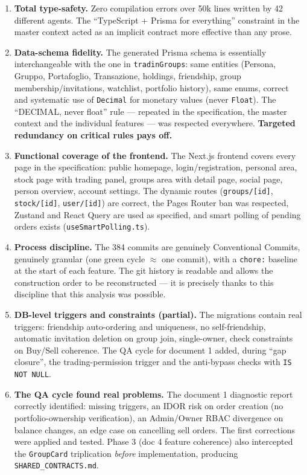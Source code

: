 \documentclass[11pt,a4paper]{article}
\newcommand{\file}[1]{\texttt{\small #1}}
\begin{document}
\begin{enumerate}[leftmargin=1.8em]
  \item \textbf{Total type-safety.} Zero compilation errors over 50k lines written by 42 different agents. The ``TypeScript + Prisma for everything'' constraint in the master context acted as an implicit contract more effective than any prose.

  \item \textbf{Data-schema fidelity.} The generated Prisma schema is essentially interchangeable with the one in \file{tradinGroups}: same entities (Persona, Gruppo, Portafoglio, Transazione, holdings, friendship, group membership/invitations, watchlist, portfolio history), same enums, correct and systematic use of \file{Decimal} for monetary values (never \file{Float}). The ``DECIMAL, never float'' rule --- repeated in the specification, the master context and the individual features --- was respected everywhere. \textbf{Targeted redundancy on critical rules pays off.}

  \item \textbf{Functional coverage of the frontend.} The Next.js frontend covers every page in the specification: public homepage, login/registration, personal area, stock page with trading panel, groups area with detail page, social page, person overview, account settings. The dynamic routes (\file{groups/[id]}, \file{stock/[id]}, \file{user/[id]}) are correct, the Pages Router ban was respected, Zustand and React Query are used as specified, and smart polling of pending orders exists (\file{useSmartPolling.ts}).

  \item \textbf{Process discipline.} The 384 commits are genuinely Conventional Commits, genuinely granular (one green cycle $\approx$ one commit), with a \file{chore:} baseline at the start of each feature. The git history is readable and allows the construction order to be reconstructed --- it is precisely thanks to this discipline that this analysis was possible.

  \item \textbf{DB-level triggers and constraints (partial).} The migrations contain real triggers: friendship auto-ordering and uniqueness, no self-friendship, automatic invitation deletion on group join, single-owner, check constraints on Buy/Sell coherence. The QA cycle for document 1 added, during ``gap closure'', the trading-permission trigger and the anti-bypass checks with \file{IS NOT NULL}.

  \item \textbf{The QA cycle found real problems.} The document 1 diagnostic report correctly identified: missing triggers, an IDOR risk on order creation (no portfolio-ownership verification), an Admin/Owner RBAC divergence on balance changes, an edge case on cancelling sell orders. The first corrections were applied and tested. Phase 3 (doc 4 feature coherence) also intercepted the \file{GroupCard} triplication \emph{before} implementation, producing \file{SHARED\_CONTRACTS.md}.


\end{enumerate}
\end{document}
